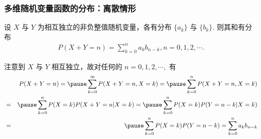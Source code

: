 %
%
%
%
%
 \begin{frame}
 	\frametitle{多维随机变量函数的分布：离散情形}
 	\begin{thm}[离散卷积公式] 设 $X$ 与 $Y$ 为相互独立的非负整值随机变量，各有分布 $\{a_k\}$ 与 $\{b_k\}$. 则其和有分布
 		\begin{eqnarray*}
 			P(X+Y=n)=\sum_{k=0}^na_kb_{n-k}, n=0,1,2,\cdots.
 		\end{eqnarray*}
 	\end{thm}
 	\pause \zheng 注意到 $X$ 与 $Y$ 相互独立，故对任何的 $n=0,1,2,\cdots,$ 有
 	\begin{eqnarray*}
 		&&\hspace{-0.7cm}P(X+Y=n)=\pause \sum_{k=0}^\infty P(X+Y=n,X=k)=\pause \sum_{k=0}^n P(X+Y=n,X=k)\\
 		&=&\pause \sum_{k=0}^n P(X=k)P(X+Y=n|X=k)=\pause \sum_{k=0}^n P(X=k)P(Y=n-k|X=k)\\
 		&=&\pause \sum_{k=0}^n P(X=k)P(Y=n-k)=\sum_{k=0}^n a_kb_{n-k}
 	\end{eqnarray*}
 \end{frame}

